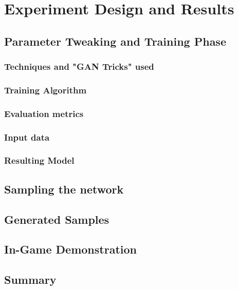 \chapter{Experiment Design and Results}
\section{Parameter Tweaking and Training Phase}
\subsection{Techniques and "GAN Tricks" used}
\subsection{Training Algorithm}
\subsection{Evaluation metrics}
\subsection{Input data}
\label{sec:InputSelection}
\subsection{Resulting Model}
\section{Sampling the network}
\section{Generated Samples}
\section{In-Game Demonstration}
\section{Summary}